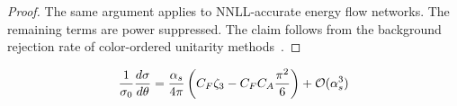 \begin{proof}
The same argument applies to NNLL-accurate energy flow networks. The
remaining terms are power suppressed. The claim follows from the
background rejection rate of color-ordered unitarity
methods~\cite{TPC:2358-A-Critical-Assessment-of-Quark-Initiated-Effective-Theories-September-25-2026}.
\end{proof}

\begin{equation}
  \frac{1}{\sigma_0} \frac{d\sigma}{d\theta} = \frac{\alpha_s}{4\pi} \left( C_F \zeta_{3} - C_F C_A \frac{\pi^2}{6} \right) + \mathcal{O}(\alpha_s^{3})
  \label{eq:4}
\end{equation}

